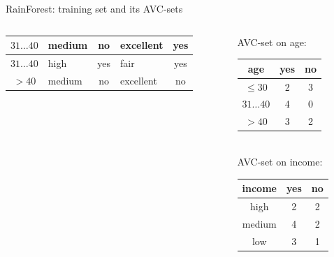 \documentclass[aspectratio=169,t,table]{beamer}
\begin{document}
{\begin{frame}{RainForest: training set and its AVC-sets}
\begin{columns}
\begin{column}{0.6\textwidth}
\begin{tabular}{|c|l|c|l|c|}
            \cellcolor{yellow!20}$31\ldots40$ & \cellcolor{yellow!20}medium & \cellcolor{yellow!20}no & \cellcolor{yellow!20}excellent & \cellcolor{green!20}yes \\\hline
            \cellcolor{yellow!20}$31\ldots40$ & \cellcolor{yellow!20}high & \cellcolor{yellow!20}yes & \cellcolor{yellow!20}fair & \cellcolor{green!20}yes \\\hline
            \cellcolor{yellow!20}$>40$ & \cellcolor{yellow!20}medium & \cellcolor{yellow!20}no & \cellcolor{yellow!20}excellent & \cellcolor{red!20}no \\\hline
          \end{tabular}
        \end{column}
        \begin{column}{0.3\textwidth}
          \vspace{-3cm}

          \centering
          AVC-set on age:\\
          \begin{tabular}{|c|c|c|}
            \hline
            age & yes & no \\\hline
            $\leq 30$ & 2 & 3 \\\hline
            $31\ldots40$ & 4 & 0 \\\hline
            $>40$ & 3 & 2 \\\hline
          \end{tabular}\\[1cm]
          AVC-set on income:\\
          \begin{tabular}{|c|c|c|}
            \hline
            income & yes & no \\\hline
            high & 2 & 2 \\\hline
            medium & 4 & 2 \\\hline
            low & 3 & 1 \\\hline
          \end{tabular}
        \end{column}
      \end{columns}
    \end{frame}
  }
\end{document}
